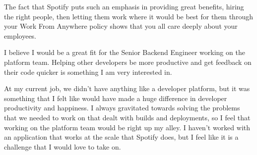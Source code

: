 \documentclass[11pt, a4paper]{awesome-cv}
\begin{document}
\begin{cvletter}
    The fact that Spotify puts such an emphasis in providing great benefits, hiring the right people, then letting them work where it would be best for them through your Work From Anywhere policy shows that you all care deeply about your employees.

    I believe I would be a great fit for the Senior Backend Engineer working on the platform team. Helping other developers be more productive and get feedback on their code quicker is something I am very interested in.

    At my current job, we didn't have anything like a developer platform, but it was something that I felt like would have made a huge difference in developer productivity and happiness. I always gravitated towards solving the problems that we needed to work on that dealt with builds and deployments, so I feel that working on the platform team would be right up my alley. I haven't worked with an application that works at the scale that Spotify does, but I feel like it is a challenge that I would love to take on.

\end{cvletter}


\makeletterclosing
\end{document}
